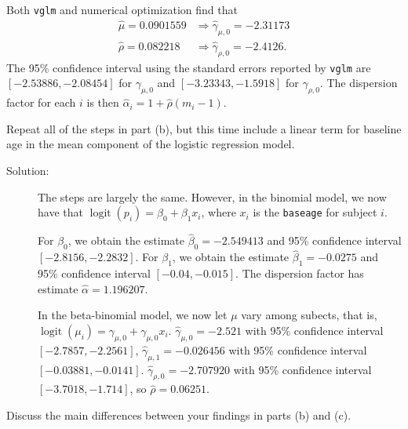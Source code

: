 \documentclass[11pt, letterpaper]{article}
\begin{document}
\begin{enumerate}[(a)]
\begin{description}
  Both \texttt{vglm} and numerical optimization find that
  \begin{align*}
    \hat{\mu} = 0.0901559 &\Rightarrow \hat{\gamma}_{\mu,0} = -2.31173 \\
    \hat{\rho} = 0.082218 &\Rightarrow \hat{\gamma}_{\rho,0} = -2.4126.
  \end{align*}
  The 95\% confidence interval using the standard errors reported by
  \texttt{vglm} are $\left[-2.53886, -2.08454\right]$ for $\gamma_{\mu,0}$ and
  $\left[-3.23343, -1.5918\right]$ for $\gamma_{\rho,0}$. The dispersion factor
  for each $i$ is then $\hat{\alpha}_i = 1 + \hat{\rho}\left(m_i - 1\right)$.
\end{description}
{\em \item Repeat all of the steps in part (b), but this time include a linear term for baseline age 
  in the mean component of the logistic regression model.}

\begin{description}
\item[Solution:] The steps are largely the same. However, in the binomial model,
  we now have that $\operatorname{logit}\left(p_i\right) = \beta_0 + \beta_1x_i$, where $x_i$ is the
  \texttt{baseage} for subject $i$.

  For $\beta_0$, we obtain the estimate $\hat{\beta}_0 = -2.549413$ and 95\%
  confidence interval $\left[-2.8156, -2.2832\right]$. For $\beta_1$, we obtain
  the estimate $\hat{\beta}_1 = -0.0275$ and 95\% confidence interval
  $\left[-0.04, -0.015\right]$. The dispersion factor has estimate
  $\hat{\alpha} = 1.196207$.

  In the beta-binomial model, we now let $\mu$ vary among subects, that is,
  $\operatorname{logit}\left(\mu_i\right) = \gamma_{\mu,0} + \gamma_{\mu,0}x_i.$
  $\hat{\gamma}_{\mu,0} = -2.521$ with 95\% confidence interval
  $\left[-2.7857, -2.2561\right]$, $\hat{\gamma}_{\mu,1} = -0.026456$ with 95\%
  confidence interval $\left[-0.03881, -0.0141\right]$.
  $\hat{\gamma}_{\rho,0} = -2.707920$ with 95\% confidence interval
  $\left[-3.7018, -1.714\right]$, so $\hat{\rho} = 0.06251$.
\end{description}

{\em \item Discuss the main differences between your findings in parts (b) and (c).}
\end{enumerate}
\end{document}
